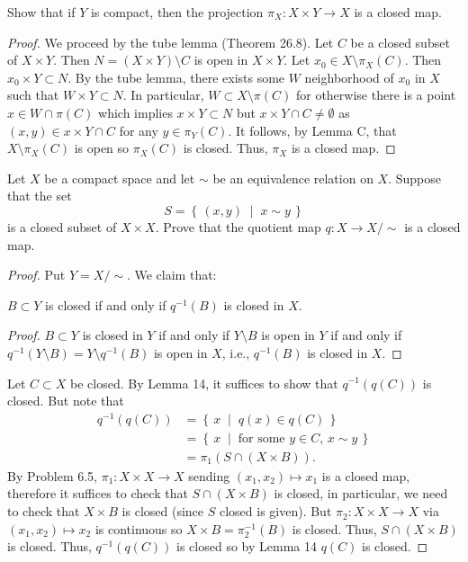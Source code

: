 \newpage
\begin{problem}[Munkres \S26, Ex.\,7]
Show that if $Y$ is compact, then the projection $\pi_X\colon
X\times Y\to X$ is a closed map.
\end{problem}
\begin{proof}
We proceed by the tube lemma (Theorem 26.8). Let $C$ be a closed
subset of $X\times Y$. Then $N=(X\times Y)\setminus C$ is open in
$X\times Y$. Let $x_0\in X\setminus\pi_X(C)$. Then $x_0\times
Y\subset N$. By the tube lemma, there exists some $W$
neighborhood of $x_0$ in $X$ such that $W\times Y\subset N$. In
particular, $W\subset X\setminus\pi(C)$ for otherwise there is a
point $x\in W\cap\pi(C)$ which implies $x\times Y\subset N$ but
$x\times Y\cap C\neq\emptyset$ as $(x,y)\in x\times Y\cap C$ for
any $y\in\pi_Y(C)$. It follows, by Lemma C, that
$X\setminus\pi_X(C)$ is open so $\pi_X(C)$ is closed. Thus,
$\pi_X$ is a closed map.
\end{proof}
\newpage
\begin{problem}[A]
Let $X$ be a compact space and let $\sim$ be an equivalence
relation on $X$. Suppose that the set
\[
S=\left\{\,(x,y)\;\middle|\;x\sim y\,\right\}
\]
is a closed subset of $X\times X$. Prove that the quotient map
$q\colon X\to X/{\sim}$ is a closed map.
\end{problem}
\begin{proof}
Put $Y=X/{\sim}$.
We claim that:
\begin{lemma}
$B\subset Y$ is closed if and only if $q^{-1}(B)$ is closed in
$X$.
\end{lemma}
\begin{proof}
\renewcommand\qedsymbol{$\clubsuit$}
$B\subset Y$ is closed in $Y$ if and only if $Y\setminus B$ is
open in $Y$ if and only if $q^{-1}(Y\setminus B)=Y\setminus
q^{-1}(B)$ is open in $X$, i.e., $q^{-1}(B)$ is closed in $X$.
\end{proof}
Let $C\subset X$ be closed. By Lemma 14, it suffices to show that
$q^{-1}(q(C))$ is closed. But note that
\begin{align*}
q^{-1}(q(C))
  &=\left\{\,x\;\middle|\;q(x)\in q(C)\,\right\}\\
  &=\left\{\,x\;\middle|\;\text{for some $y\in C$, $x\sim
    y$}\,\right\}\\
  &=\pi_1(S\cap (X\times B)).
\end{align*}
By Problem 6.5, $\pi_1\colon X\times X\to X$ sending
$(x_1,x_2)\mapsto x_1$ is a closed map, therefore it suffices to
check that $S\cap (X\times B)$ is closed, in particular, we need
to check that $X\times B$ is closed (since $S$ closed is
given). But $\pi_2\colon X\times X\to X$ via $(x_1,x_2)\mapsto
x_2$ is continuous so $X\times B=\pi_2^{-1}(B)$ is closed. Thus,
$S\cap (X\times B)$ is closed. Thus, $q^{-1}(q(C))$ is closed so
by Lemma 14 $q(C)$ is closed.
\end{proof}
